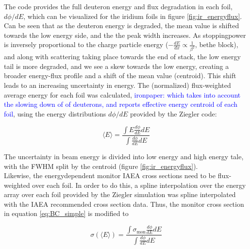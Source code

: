 The code provides the full deuteron energy and flux degradation in each foil, $d\phi/dE$, which can be visualized for the iridium foils in figure \ref{fig:ir_energyflux}.  Can be seen that as the deuteron energy is degraded, the mean value is shifted towards the low energy side, and the the peak width increases. As stoppingpower is inversely proportional to the charge particle energy ($-\frac{dE}{dx}\propto \frac{1}{\beta^2}$, bethe block), and along with scattering taking place towards the end of stack, the low energy tail is more degraded, and we see a skew towards the low energy, creating a broader energy-flux profile and a shift of the mean value (centroid). This shift leads to an increasing uncertainty in energy. The (normalized) flux-weighted average energy for each foil was calculated, \textcolor{blue}{ironpaper: which takes into account the slowing down of of deuterons, and reports effective energy centroid of each foil}, using the energy distributions $d\phi/dE$ provided by the Ziegler code:

\begin{equation} \label{eq:flux_weighted_average_energy}
    \langle E \rangle = \frac{\int E \frac{d\phi}{dE}dE}{\int \frac{d\phi}{dE}dE}
\end{equation}

\noindent 
The uncertainty in beam energy is divided into low energy and high energy tale, with the FWHM split by the centroid (figure \ref{fig:ir_energyflux}). \\ 

\noindent 
Likewise, the energydependent monitor IAEA cross sections need to be flux-weighted over each foil. In order to do this, a spline interpolation over the energy array over each foil provided by the Ziegler simulation was spline interpolated with the IAEA recommended cross section data. Thus, the monitor cross section in equation \ref{eq:BC_simple} is modified to 


\begin{equation}
    \sigma (\langle E\rangle) = \frac{\int \sigma_\text{mon} \frac{d\phi}{dE}dE}{\int \frac{d\phi}{dE}dE}
\end{equation}


